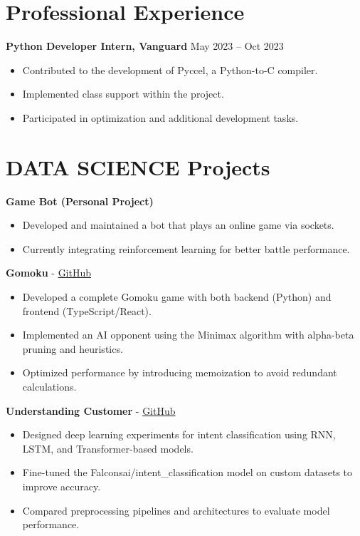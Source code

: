 \documentclass[a4paper,11pt]{article}%
\begin{document}
\section*{Professional Experience}%
\textbf{Python Developer Intern, Vanguard} \hfill May 2023 -- Oct 2023%
\begin{itemize}[leftmargin=*]%
\item Contributed to the development of Pyccel, a Python-to-C compiler.%
\item Implemented class support within the project.%
\item Participated in optimization and additional development tasks.%
\end{itemize}%
\section*{DATA SCIENCE Projects}%
%
\noindent \textbf{Game Bot (Personal Project)}%
\begin{itemize}[leftmargin=2em,label={},parsep=0pt,topsep=1em]%
\item Developed and maintained a bot that plays an online game via sockets.%
\item Currently integrating reinforcement learning for better battle performance.%
\end{itemize}%
%
\noindent \textbf{Gomoku} - \href{https://github.com/sboof911/Gomoku}{GitHub}%
\begin{itemize}[leftmargin=2em,label={},parsep=0pt,topsep=1em]%
\item Developed a complete Gomoku game with both backend (Python) and frontend (TypeScript/React).%
\item Implemented an AI opponent using the Minimax algorithm with alpha-beta pruning and heuristics.%
\item Optimized performance by introducing memoization to avoid redundant calculations.%
\end{itemize}%
%
\noindent \textbf{Understanding Customer} - \href{https://github.com/sboof911/Understanding-customer}{GitHub}%
\begin{itemize}[leftmargin=2em,label={},parsep=0pt,topsep=1em]%
\item Designed deep learning experiments for intent classification using RNN, LSTM, and Transformer-based models.%
\item Fine-tuned the Falconsai/intent\_classification model on custom datasets to improve accuracy.%
\item Compared preprocessing pipelines and architectures to evaluate model performance.%
\end{itemize}%
\end{document}
